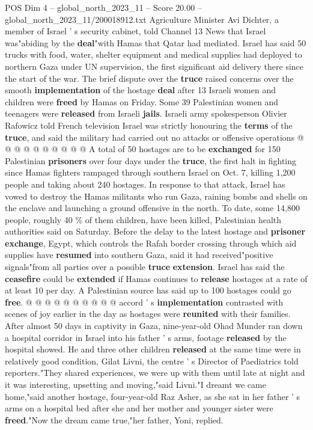 \begin{textsample}{POS Dim 4 – global\_north\_2023\_11 – Score 20.00 – global\_north\_2023\_11/200018912.txt}
Agriculture Minister Avi Dichter, a member of Israel ' s security cabinet, told Channel 13 News that Israel was"abiding by the \textbf{deal}"with Hamas that Qatar had mediated.
Israel has said 50 trucks with food, water, shelter equipment and medical supplies had deployed to northern Gaza under UN supervision, the first significant aid delivery there since the start of the war.
The brief dispute over the \textbf{truce} raised concerns over the smooth \textbf{implementation} of the hostage \textbf{deal} after 13 Israeli women and children were \textbf{freed} by Hamas on Friday.
Some 39 Palestinian women and teenagers were \textbf{released} from Israeli \textbf{jails}.
Israeli army spokesperson Olivier Rafowicz told French television Israel was strictly honouring the \textbf{terms} of the \textbf{truce}, and said the military had carried out no attacks or offensive operations @ @ @ @ @ @ @ @ @ @ A total of 50 hostages are to be \textbf{exchanged} for 150 Palestinian \textbf{prisoners} over four days under the \textbf{truce}, the first halt in fighting since Hamas fighters rampaged through southern Israel on Oct. 7, killing 1,200 people and taking about 240 hostages.
In response to that attack, Israel has vowed to destroy the Hamas militants who run Gaza, raining bombs and shells on the enclave and launching a ground offensive in the north.
To date, some 14,800 people, roughly 40 \% of them children, have been killed, Palestinian health authorities said on Saturday.
Before the delay to the latest hostage and \textbf{prisoner} \textbf{exchange}, Egypt, which controls the Rafah border crossing through which aid supplies have \textbf{resumed} into southern Gaza, said it had received"positive signals"from all parties over a possible \textbf{truce} \textbf{extension}.
Israel has said the \textbf{ceasefire} could be \textbf{extended} if Hamas continues to \textbf{release} hostages at a rate of at least 10 per day.
A Palestinian source has said up to 100 hostages could go \textbf{free}. @ @ @ @ @ @ @ @ @ @ accord ' s \textbf{implementation} contrasted with scenes of joy earlier in the day as hostages were \textbf{reunited} with their families.
After almost 50 days in captivity in Gaza, nine-year-old Ohad Munder ran down a hospital corridor in Israel into his father ' s arms, footage \textbf{released} by the hospital showed.
He and three other children \textbf{released} at the same time were in relatively good condition, Gilat Livni, the centre ' s Director of Paediatrics told reporters."They shared experiences, we were up with them until late at night and it was interesting, upsetting and moving,"said Livni."I dreamt we came home,"said another hostage, four-year-old Raz Asher, as she sat in her father ' s arms on a hospital bed after she and her mother and younger sister were \textbf{freed}."Now the dream came true,"her father, Yoni, replied.

\end{textsample}
